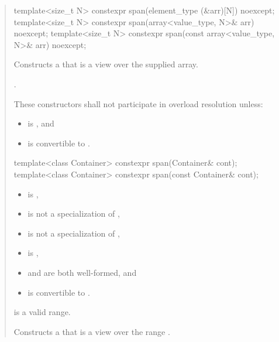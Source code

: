 \documentclass{wg21}
\begin{document}
\begin{quote}
\begin{itemdecl}
template<size_t N> constexpr span(element_type (&arr)[N]) noexcept;
template<size_t N> constexpr span(array<value_type, N>& arr) noexcept;
template<size_t N> constexpr span(const array<value_type, N>& arr) noexcept;
\end{itemdecl}
\begin{itemdescr}
    \pnum
    \effects
    Constructs a  that is a view over the supplied array.

    \pnum
    \ensures
    .

    \pnum
    \remarks
    These constructors shall not participate in overload resolution unless:
    \begin{itemize}
        \item {} is , and
        \item {} is convertible to .
    \end{itemize}
\end{itemdescr}

\begin{removedblock}
\begin{itemdecl}
template<class Container> constexpr span(Container& cont);
template<class Container> constexpr span(const Container& cont);
\end{itemdecl}

\begin{itemdescr}
\pnum
\constraints
\begin{itemize}
	\item {} is ,
	\item {} is not a specialization of ,
	\item {} is not a specialization of ,
	\item {} is ,
	\item {} and  are both well-formed, and
	\item {} is convertible to .
\end{itemize}

\pnum
\expects
{} is a valid range.

\pnum
\effects
Constructs a  that is a view over the range .


\end{itemdescr}
\end{removedblock}
\end{quote}
\end{document}
